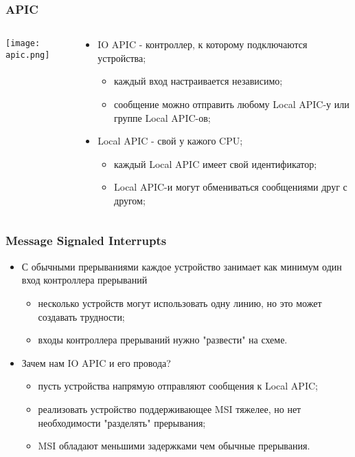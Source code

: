 \begin{frame}
\frametitle{APIC}
\begin{columns}
  \begin{column}{0.35\textwidth}
  \begin{center}
    \texttt{[image: apic.png]}
  \end{center}
  \end{column}
  \begin{column}{0.65\textwidth}
  \begin{itemize}
    \item IO APIC - контроллер, к которому подключаются устройства;
    \begin{itemize}
      \item каждый вход настраивается независимо;
      \item сообщение можно отправить любому Local APIC-у или группе Local
      APIC-ов;
    \end{itemize}
    \item Local APIC - свой у кажого CPU;
    \begin{itemize}
      \item каждый Local APIC имеет свой идентификатор;
      \item Local APIC-и могут обмениваться сообщениями друг с другом;
    \end{itemize}
  \end{itemize}
  \end{column}
\end{columns}
\end{frame}

\begin{frame}
\frametitle{Message Signaled Interrupts}
\begin{itemize}
  \item С обычными прерываниями каждое устройство занимает как минимум один вход
  контроллера прерываний
  \begin{itemize}
    \item несколько устройств могут использовать одну линию, но это может
    создавать трудности;
    \item входы контроллера прерываний нужно "развести" на схеме.
  \end{itemize}
  \item Зачем нам IO APIC и его провода?
  \begin{itemize}
    \item пусть устройства напрямую отправляют сообщения к Local APIC;
    \item реализовать устройство поддерживающее MSI тяжелее, но нет
    необходимости "разделять" прерывания;
    \item MSI обладают меньшими задержками чем обычные прерывания.
  \end{itemize}
\end{itemize}
\end{frame}
